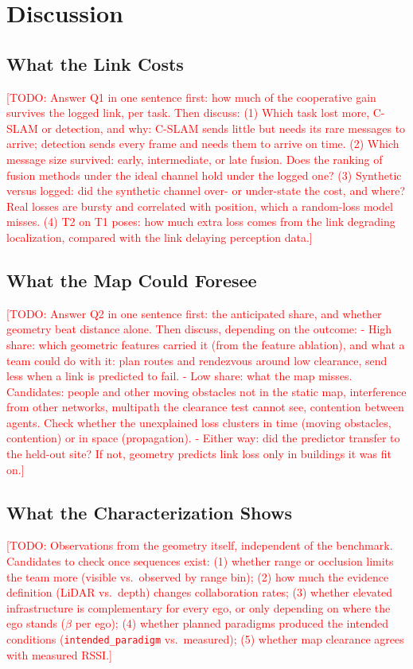 \documentclass[conference]{IEEEtran}
\newcommand{\todo}[1]{\textcolor{red}{[TODO: #1]}}
\begin{document}


\section{Discussion}
\label{sec:discussion}

\subsection{What the Link Costs}
\label{sec:findings}
\todo{Answer Q1 in one sentence first: how much of the cooperative
gain survives the logged link, per task.
Then discuss:
(1) Which task lost more, C-SLAM or detection, and why: C-SLAM sends
    little but needs its rare messages to arrive; detection sends every
    frame and needs them to arrive on time.
(2) Which message size survived: early, intermediate, or late fusion.
    Does the ranking of fusion methods under the ideal channel hold
    under the logged one?
(3) Synthetic versus logged: did the synthetic channel over- or
    under-state the cost, and where? Real losses are bursty and
    correlated with position, which a random-loss model misses.
(4) T2 on T1 poses: how much extra loss comes from the link degrading
    localization, compared with the link delaying perception data.}

\subsection{What the Map Could Foresee}
\todo{Answer Q2 in one sentence first: the anticipated share, and
whether geometry beat distance alone.
Then discuss, depending on the outcome:
- High share: which geometric features carried it (from the feature
  ablation), and what a team could do with it: plan routes and
  rendezvous around low clearance, send less when a link is predicted
  to fail.
- Low share: what the map misses. Candidates: people and other
  moving obstacles not in the static map, interference from other
  networks, multipath the clearance test cannot see, contention
  between agents. Check whether the unexplained loss clusters in
  time (moving obstacles, contention) or in space (propagation).
- Either way: did the predictor transfer to the held-out site? If
  not, geometry predicts link loss only in buildings it was fit on.}

\subsection{What the Characterization Shows}
\todo{Observations from the geometry itself, independent of the
benchmark. Candidates to check once sequences exist:
(1) whether range or occlusion limits the team more (visible vs.\
observed by range bin);
(2) how much the evidence definition (LiDAR vs.\ depth) changes
collaboration rates;
(3) whether elevated infrastructure is complementary for every ego, or
only depending on where the ego stands ($\beta$ per ego);
(4) whether planned paradigms produced the intended conditions
(\texttt{intended\_paradigm} vs.\ measured);
(5) whether map clearance agrees with measured RSSI.}
\end{document}
